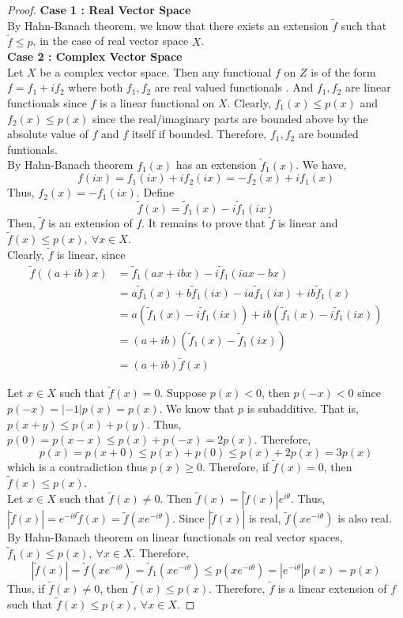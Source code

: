 \begin{proof}
	\textbf{Case 1 : Real Vector Space}\\
	By Hahn-Banach theorem, we know that there exists an extension $\tilde{f}$ such that $\tilde{f} \le p$, in the case of real vector space $X$.\\

	\textbf{Case 2 : Complex Vector Space}\\
	Let $X$ be a complex vector space.
	Then any functional $f$ on $Z$ is of the form $f = f_1 + if_2$ where both $f_1,f_2$ are real valued functionals .
	And $f_1,f_2$ are linear functionals since $f$ is a linear functional on $X$.
	Clearly, $f_1(x) \le p(x)$ and $f_2(x) \le p(x)$ since the real/imaginary parts are bounded above by the absolute value of $f$ and $f$ itself if bounded.
	Therefore, $f_1,f_2$ are bounded funtionals.\\

	By Hahn-Banach theorem $f_1(x)$ has an extension $\tilde{f}_1(x)$.
	We have,	
	\[ f(ix) = f_1(ix)+if_2(ix) = -f_2(x)+if_1(x) \]
	Thus, $f_2(x) = -f_1(ix)$.
	Define
	\[ \tilde{f}(x) = \tilde{f}_1(x) - i \tilde{f}_1(ix) \]
	Then, $\tilde{f}$ is an extension of $f$.
	It remains to prove that $\tilde{f}$ is linear and $\tilde{f}(x) \le p(x),\ \forall x \in X$.\\

	Clearly, $\tilde{f}$ is linear, since
	\begin{align*}
		\tilde{f}((a+ib)x) 
		& = \tilde{f}_1(ax+ibx) - i\tilde{f}_1(iax-bx)\\
		& = a\tilde{f}_1(x) + b\tilde{f}_1(ix) - ia\tilde{f}_1(ix) + ib \tilde{f}_1(x) \\
		& = a \left(\tilde{f}_1(x)-i\tilde{f}_1(ix) \right) + ib \left(\tilde{f}_1(x)-i\tilde{f}_1(ix) \right) \\
		& = (a+ib) \left(\tilde{f}_1(x) - \tilde{f}_1(ix) \right) \\
		& = (a+ib)\tilde{f}(x)
	\end{align*}

	Let $x \in X$ such that $\tilde{f}(x) = 0$.
	Suppose $p(x) < 0$, then $p(-x) < 0$ since $p(-x) = |-1|p(x) = p(x)$.
	We know that $p$ is subadditive.
	That is, $p(x+y) \le p(x)+p(y)$.
	Thus, $p(0) = p(x-x) \le p(x) + p(-x) = 2p(x)$.
	Therefore, 
	\[ p(x) = p(x+0) \le p(x) + p(0) \le p(x) + 2p(x) = 3p(x) \]
	which is a contradiction thus $p(x) \ge 0$.
	Therefore, if $\tilde{f}(x) = 0$, then $\tilde{f}(x) \le p(x)$.\\

	Let $x \in X$ such that $\tilde{f}(x) \ne 0$.
	Then $\tilde{f}(x) = |\tilde{f}(x)|e^{i\theta}$.
	Thus, $|\tilde{f}(x)| = e^{-i\theta}\tilde{f}(x) = \tilde{f}(xe^{-i\theta})$.
	Since $|\tilde{f}(x)|$ is real, $\tilde{f}(xe^{-i\theta})$ is also real.
	By Hahn-Banach theorem on linear functionals on real vector spaces, $\tilde{f}_1(x) \le p(x),\ \forall x \in X$.
	Therefore,
	\[ |\tilde{f}(x)| = \tilde{f}(xe^{-i\theta}) = \tilde{f}_1\left(xe^{-i\theta}\right) \le p\left(xe^{-i\theta}\right) = |e^{-i\theta}|p(x) = p(x) \]
	Thus, if $\tilde{f}(x) \ne 0$, then $\tilde{f}(x) \le p(x)$.
	Therefore, $\tilde{f}$ is a linear extension of $f$ such that $\tilde{f}(x) \le p(x),\ \forall x \in X$.
\end{proof}

